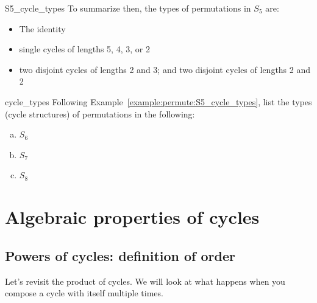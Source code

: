 \begin{example}{S5_cycle_types}
\noindent
To summarize then, the types of permutations in $S_5$ are:
\begin{itemize}
\item
The identity
\item
single cycles of lengths 5, 4, 3, or 2
\item
two disjoint cycles of lengths 2 and 3;  and two disjoint cycles of lengths 2 and 2
\end{itemize}
\end{example}

\begin{exercise}{cycle_types}
Following Example~\ref{example:permute:S5_cycle_types}, list the types (cycle structures) of permutations in the following:
\begin{multicols}{3}
\begin{enumerate}[(a)]
\item
$S_6$
\item
$S_7$
\item
$S_8$
\end{enumerate}
\end{multicols}
\end{exercise}

\section{Algebraic properties of cycles\quad
{}}
\subsection{Powers of cycles: definition of order}

Let's revisit the product of cycles.  We will look at what happens when you compose a cycle with itself multiple times.

